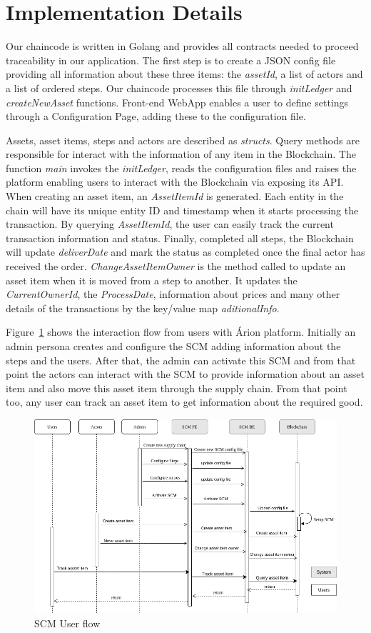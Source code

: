\section{Implementation Details} \label{sec:Implementation}
Our chaincode is written in Golang and provides all contracts needed to proceed traceability in our application. The first step is to create a JSON config file providing all information about these three items: the \textit{assetId}, a list of actors and a list of ordered steps. Our chaincode processes this file through  \textit{initLedger} and \textit{createNewAsset} functions. Front-end WebApp enables a user to define settings through a Configuration Page, adding these to the configuration file. 

Assets, asset items, steps and actors are described as \textit{structs}. Query methods are responsible for interact with the information of any item in the Blockchain. The function \textit{main} invokes the \textit{initLedger}, reads the configuration files and raises the platform enabling users to interact with the Blockchain via exposing its API. When creating an asset item, an \textit{AssetItemId} is generated. Each entity in the chain will have its unique entity ID and timestamp when it starts processing the transaction. By querying \textit{AssetItemId}, the user can easily track the current transaction information and status. Finally, completed all steps, the Blockchain will update \textit{deliverDate} and mark the status as completed once the final actor has received the order. \textit{ChangeAssetItemOwner} is the method called to update an asset item when it is moved from a step to another. It updates the \textit{CurrentOwnerId}, the \textit{ProcessDate}, information about prices and many other details of the transactions by the key/value map \textit{  aditionalInfo}. 

Figure~\ref{fig:sequenceDiagram} shows the interaction flow from users with Árion platform. Initially an admin persona creates and configure the SCM adding information about the steps and the users. After that, the admin can activate this SCM and from that point the actors can interact with the SCM to provide information about an asset item and also move this asset item through the supply chain. From that point too, any user can track an asset item to get information about the required good.

\begin{figure}[ht]
\begin{center}
  \includegraphics[scale=0.5]{images/SequenceDiagram.png}
\caption{SCM User flow}
\label{fig:sequenceDiagram}
\end{center}
\end{figure}